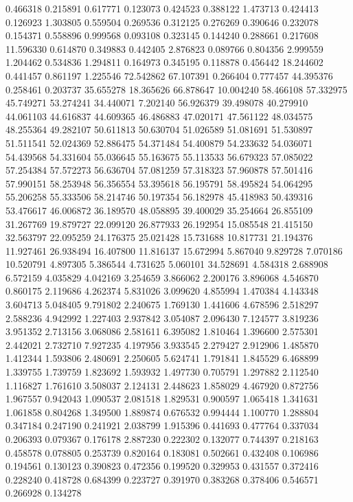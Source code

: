 0.466318
0.215891
0.617771
0.123073
0.424523
0.388122
1.473713
0.424413
0.126923
1.303805
0.559504
0.269536
0.312125
0.276269
0.390646
0.232078
0.154371
0.558896
0.999568
0.093108
0.323145
0.144240
0.288661
0.217608
11.596330
0.614870
0.349883
0.442405
2.876823
0.089766
0.804356
2.999559
1.204462
0.534836
1.294811
0.164973
0.345195
0.118878
0.456442
18.244602
0.441457
0.861197
1.225546
72.542862
67.107391
0.266404
0.777457
44.395376
0.258461
0.203737
35.655278
18.365626
66.878647
10.004240
58.466108
57.332975
45.749271
53.274241
34.440071
7.202140
56.926379
39.498078
40.279910
44.061103
44.616837
44.609365
46.486883
47.020171
47.561122
48.034575
48.255364
49.282107
50.611813
50.630704
51.026589
51.081691
51.530897
51.511541
52.024369
52.886475
54.371484
54.400879
54.233632
54.036071
54.439568
54.331604
55.036645
55.163675
55.113533
56.679323
57.085022
57.254384
57.572273
56.636704
57.081259
57.318323
57.960878
57.501416
57.990151
58.253948
56.356554
53.395618
56.195791
58.495824
54.064295
55.206258
55.333506
58.214746
50.197354
56.182978
45.418983
50.439316
53.476617
46.006872
36.189570
48.058895
39.400029
35.254664
26.855109
31.267769
19.879727
22.099120
26.877933
26.192954
15.085548
21.415150
32.563797
22.095259
24.176375
25.021428
15.731688
10.817731
21.194376
11.927461
26.938494
16.407800
11.816137
15.672994
5.867040
9.829728
7.070186
10.520791
4.897305
5.386544
4.731625
5.060101
34.528691
4.584318
2.688908
6.572159
4.035829
4.042169
3.254659
3.866062
2.200176
3.896068
4.546870
0.860175
2.119686
4.262374
5.831026
3.099620
4.855994
1.470384
4.143348
3.604713
5.048405
9.791802
2.240675
1.769130
1.441606
4.678596
2.518297
2.588236
4.942992
1.227403
2.937842
3.054087
2.096430
7.124577
3.819236
3.951352
2.713156
3.068086
2.581611
6.395082
1.810464
1.396600
2.575301
2.442021
2.732710
7.927235
4.197956
3.933545
2.279427
2.912906
1.485870
1.412344
1.593806
2.480691
2.250605
5.624741
1.791841
1.845529
6.468899
1.339755
1.739759
1.823692
1.593932
1.497730
0.705791
1.297882
2.112540
1.116827
1.761610
3.508037
2.124131
2.448623
1.858029
4.467920
0.872756
1.967557
0.942043
1.090537
2.081518
1.829531
0.900597
1.065418
1.341631
1.061858
0.804268
1.349500
1.889874
0.676532
0.994444
1.100770
1.288804
0.347184
0.247190
0.241921
2.038799
1.915396
0.441693
0.477764
0.337034
0.206393
0.079367
0.176178
2.887230
0.222302
0.132077
0.744397
0.218163
0.458578
0.078805
0.253739
0.820164
0.183081
0.502661
0.432408
0.106986
0.194561
0.130123
0.390823
0.472356
0.199520
0.329953
0.431557
0.372416
0.228240
0.418728
0.684399
0.223727
0.391970
0.383268
0.378406
0.546571
0.266928
0.134278
